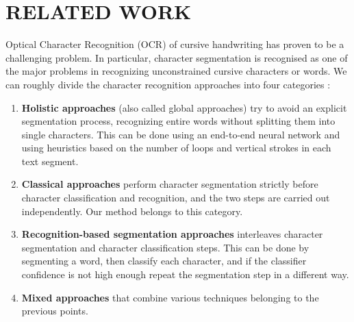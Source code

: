 \section{RELATED WORK}
\label{sec:relatedwork}

Optical Character Recognition (OCR) of cursive handwriting has proven to be a challenging problem. In particular, character segmentation is recognised as one of the major problems in recognizing unconstrained cursive characters or words. We can roughly divide the character recognition approaches into four categories \cite{Blumenstein2008-we}:
\begin{enumerate}
	\item \textbf{Holistic approaches} (also called global approaches) try to avoid an explicit segmentation process, recognizing entire words without splitting them into single characters. This can be done using an end-to-end neural network and using heuristics based on the number of loops and vertical strokes in each text segment.
	\item \textbf{Classical approaches} perform character segmentation strictly before character classification and recognition, and the two steps are carried out independently. Our method belongs to this category.
	\item \textbf{Recognition-based segmentation approaches} interleaves character segmentation and character classification steps. This can be done by segmenting a word, then classify each character, and if the classifier confidence is not high enough repeat the segmentation step in a different way.
	\item \textbf{Mixed approaches} that combine various techniques belonging to the previous points.
\end{enumerate}

